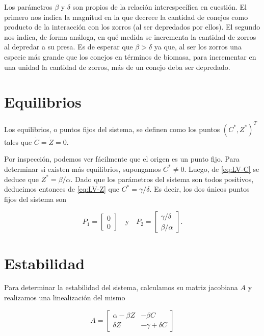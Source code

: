 \documentclass[10pt,twocolumn]{article}
\begin{document}
Los parámetros $\beta$ y $\delta$ son propios de la relación interespecífica en cuestión. El primero nos indica la magnitud en la que decrece la cantidad de conejos como producto de la interacción con los zorros (al ser depredados por ellos). El segundo nos indica, de forma análoga, en qué medida se incrementa la cantidad de zorros al depredar a su presa. Es de esperar que $\beta > \delta$ ya que, al ser los zorros una especie más grande que los conejos en términos de biomasa, para incrementar en una unidad la cantidad de zorros, más de un conejo deba ser depredado.


\section{Equilibrios}

Los equilibrios, o puntos fijos del sistema, se definen como los puntos $(C^*,Z^*)^T$ tales que $\dot{C} = \dot{Z} = 0$.

Por inspección, podemos ver fácilmente que el origen es un punto fijo. Para determinar si existen más equilibrios, supongamos $C^* \neq 0$. Luego, de \ref{eq:LV-C} se deduce que $Z^* = \beta / \alpha$. Dado que los parámetros del sistema son todos positivos, deducimos entonces de \ref{eq:LV-Z} que $C^* = \gamma / \delta$. Es decir, los dos únicos puntos fijos del sistema son

\begin{equation}
P_1 =
\begin{bmatrix}
0 \\
0 
\end{bmatrix}
\quad
\text{y}
\quad
P_2 =
\begin{bmatrix}
\gamma / \delta \\
\beta / \alpha
\end{bmatrix}.
\end{equation}



\section{Estabilidad}

Para determinar la estabilidad del sistema, calculamos su matriz jacobiana $A$ y realizamos una linealización del mismo

\begin{equation}
A =
\begin{bmatrix}
\alpha - \beta Z & -\beta C \\
\delta Z & -\gamma + \delta C
\end{bmatrix}
\end{equation}
\end{document}
